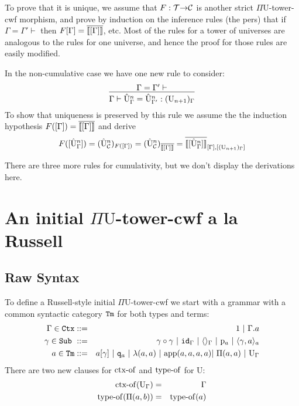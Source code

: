 \documentclass{lmcs}
\def\UU{\mathrm{U}}
\def\UUhat{\hat{\UU}}
\begin{document}
To prove that it is unique, we assume that $F : {\mathcal T} {\rightarrow} {\mathcal C}$ is another strict $\Pi\UU$-tower-cwf
morphism, and prove by induction on the inference rules (the pers) that if $\Gamma = \Gamma' \vdash$
then $F[\Gamma] = \overline{\llbracket [\Gamma] \rrbracket}$, etc.  Most of the rules for a tower of universes are analogous to the rules for one universe, and hence the proof for those rules are easily modified.

In the non-cumulative case we have one new rule to consider:
$$
\infer{\Gamma \vdash \UUhat^n_\Gamma =  \UUhat^n_{\Gamma'}: (\UU_{n+1})_\Gamma}{\Gamma = \Gamma' \vdash}
$$
To show that uniqueness is preserved by this rule we assume the the induction hypothesis $F([\Gamma]) = \overline{\llbracket [\Gamma] \rrbracket}$ and derive 
$$
F([\UUhat^n_\Gamma]) = (\UUhat^n_\C)_{F([\Gamma])} = (\UUhat^n_\C)_{\iniCtx{[\Gamma]}} 
= \iniTm{[\Gamma]}{[(\UU_{n+1})_\Gamma]}{[\UUhat^n_\Gamma]}
$$

There are three more rules for cumulativity, but we don't display the derivations here.

\section{An initial $\Pi\UU$-tower-cwf a la Russell}

\subsection{Raw Syntax}
To define a Russell-style initial $\Pi\UU$-tower-cwf we start with a grammar with a common syntactic category ${\tt Tm}$ for both types and terms:
\begin{eqnarray*}
\Gamma \in \RawCtx &::=& 1  \ |\ \Gamma.a\\
\gamma \in \RawSub \ &::=& \gamma \circ \gamma \ |\ \id_\Gamma \ |\ \langle\rangle_\Gamma \ |\ \p_{a} \ |\ \langle \gamma, a \rangle_a\\
a \in \RawTm &::=& a [\gamma] \ |\ \qI_a\  |\   \lambda(a,a) \ |\ 
\ap(a,a,a,a) |\  \Pi(a,a)  \ |\  \UU_\Gamma
\end{eqnarray*}
There are two new clauses for $\operatorname{ctx-of}$ and $\operatorname{type-of}$ for $\UU$:
\begin{eqnarray*}
\ctxof(\UU_\Gamma) &=& \Gamma\\
\typeof(\Pi(a,b))&=& \typeof(a)
\end{eqnarray*}
\end{document}
